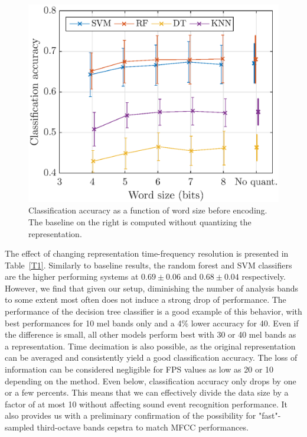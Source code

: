 \documentclass[final,3p,times,twocolumn]{elsarticle}
\begin{document}
\begin{figure}[htbp]
	\centering
		\includegraphics[width=\columnwidth]{figures/class_mel_q.eps}
	\caption{Classification accuracy as a function of word size before encoding. The baseline on the right is computed without quantizing the representation.}
	\label{fig:class_mel_q}
\end{figure}

The effect of changing representation time-frequency resolution is presented in Table~\ref{T1}. Similarly to baseline results, the random forest and SVM classifiers are the higher performing systems at $0.69\pm 0.06$ and $0.68\pm 0.04$ respectively. However, we find that given our setup, diminishing the number of analysis bands to some extent most often does not induce a strong drop of performance. The performance of the decision tree classifier is a good example of this behavior, with best performances for 10 mel bands only and a 4\% lower accuracy for 40. Even if the difference is small, all other models perform best with 30 or 40 mel bands as a representation. Time decimation is also possible, as the original representation can be averaged and consistently yield a good classification accuracy. The loss of information can be considered negligible for FPS values as low as 20 or 10 depending on the method. Even below, classification accuracy only drops by one or a few percents. This means that we can effectively divide the data size by a factor of at most 10 without affecting sound event recognition performance. It also provides us with a preliminary confirmation of the possibility for "fast"-sampled third-octave bands cepstra to match  MFCC performances.\\
\end{document}
